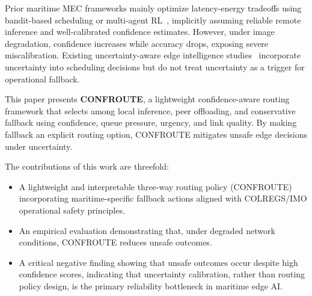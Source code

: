 \documentclass[10pt, conference]{IEEEtran}
\begin{document}
Prior maritime MEC frameworks mainly optimize latency-energy tradeoffs using bandit-based scheduling or multi-agent RL~\cite{yang2022mab_maritime, he2025distributed_maritime, ning2025marho}, implicitly assuming reliable remote inference and well-calibrated confidence estimates. However, under image degradation, confidence increases while accuracy drops, exposing severe miscalibration. Existing uncertainty-aware edge intelligence studies~\cite{zhang2022edgeuncertainty} incorporate uncertainty into scheduling decisions but do not treat uncertainty as a trigger for operational fallback.

This paper presents \textbf{CONFROUTE}, a lightweight confidence-aware routing framework that selects among local inference, peer offloading, and conservative fallback using confidence, queue pressure, urgency, and link quality. By making fallback an explicit routing option, CONFROUTE mitigates unsafe edge decisions under uncertainty.

The contributions of this work are threefold:
\begin{itemize}
\item A lightweight and interpretable three-way routing policy (CONFROUTE) incorporating maritime-specific fallback actions aligned with COLREGS/IMO operational safety principles.
\item An empirical evaluation demonstrating that, under degraded network conditions, CONFROUTE reduces unsafe outcomes.
\item A critical negative finding showing that unsafe outcomes occur despite high confidence scores, indicating that uncertainty calibration, rather than routing policy design, is the primary reliability bottleneck in maritime edge AI.
\end{itemize}


\end{document}
